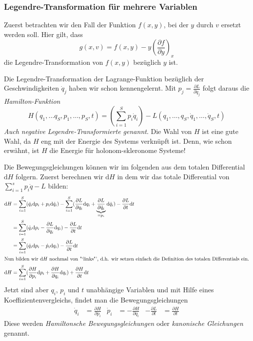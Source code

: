 \documentclass[oneside]{book}
\theoremstyle{definition}
\renewcommand{\d}{\mathrm d}
\newcommand{\md}{\d}
\begin{document}
\subsubsection{Legendre-Transformation für mehrere Variablen}
Zuerst betrachten wir den Fall der Funktion $f(x,y)$, bei der $y$ durch $v$ ersetzt werden soll. Hier gilt, dass
\[g(x,v) = f(x,y) - y\left(\frac{\partial f}{\partial y}\right)_x\]
die Legendre-Transformation von $f(x,y)$ bezüglich $y$ ist.

Die Legendre-Transformation der Lagrange-Funktion bezüglich der Geschwindigkeiten $\dot q_j$ haben wir schon kennengelernt. Mit $p_j = \frac{\partial L}{\partial \dot q_j}$ folgt daraus die \emph{Hamilton-Funktion}
\[H(q_1,\ldots q_S,  p_1,\ldots, p_S,t) = \left(\sum\limits_{i=1}^S p_i \dot q_i\right) - L(q_1, \ldots,q_S, \dot q_1, \ldots, \dot q_S, t)\]
\textit{Auch negative Legendre-Transformierte genannt}.
Die Wahl von $H$ ist eine gute Wahl, da $H$ eng mit der Energie des Systems verknüpft ist. Denn, wie schon erwähnt, ist $H$ die Energie für holonom-skleronome Systeme!

Die Bewegungsgleichungen können wir im folgenden aus dem totalen Differential $\md H$ folgern.
Zuerst berechnen wir $\d H$ in dem wir das totale Differential von $\sum_{i=1}^s p_i \dot{q} - L$ bilden:
\begin{align*}
\md H &= \sum\limits_{i=1}^S (\dot q_i \md p_i + p_i \md \dot q_i) - \sum\limits_{i=1}^S (\frac{\partial L}{\partial q_i} \md q_i + \underbrace{\frac{\partial L}{\partial \dot q_i}}_{=p_i} \md \dot q_i) - \frac{\partial L}{\partial t} \md t\\
&=\sum\limits_{i=1}^S(\dot q_i \md p_i - \frac{\partial L}{\partial q_i}\md q_i) - \frac{\partial L}{\partial t}\md t\\
&=\sum\limits_{i=1}^S(\dot q_i \md p_i - \dot p_i\md q_i) - \frac{\partial L}{\partial t}\md t\\
\intertext{Nun bilden wir $\d H$ nochmal von "`links"', d.h. wir setzen einfach die Definition des totalen Differentials ein.}
\d H &= \sum\limits_{i=1}^S(\frac{\partial H}{\partial p_i}\md p_i + \frac{\partial H}{\partial q_i}\md q_i) + \frac{\partial H}{\partial t}\md t\\
\end{align*}
Jetzt sind aber $q_i$, $p_i$ und $t$ unabhängige Variablen und mit Hilfe eines Koeffizientenvergleichs, findet man die Bewegungsgleichungen
\begin{align*}
\dot q_i &= \frac{\partial H}{\partial p_i} & \dot p_i &= - \frac{\partial H}{\partial q_i} & -\frac{\partial L}{\partial t} &= \frac{\partial H}{\partial t}
\end{align*}
Diese werden \emph{Hamiltonsche Bewegungsgleichungen} oder \emph{kanonische Gleichungen} genannt.
\end{document}
